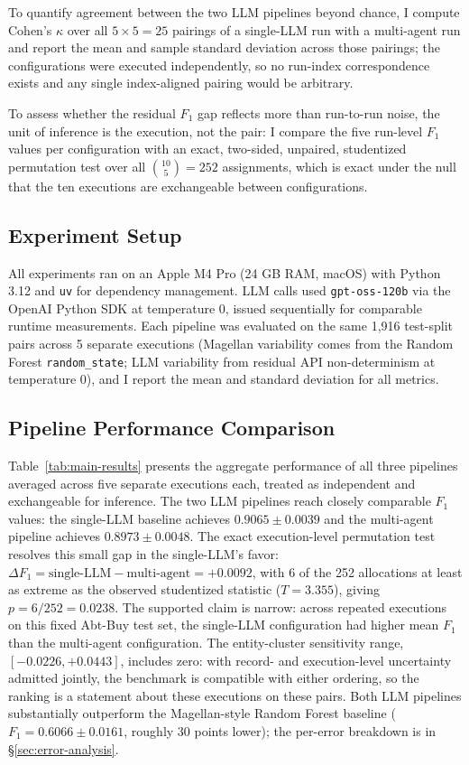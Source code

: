 \documentclass[sigconf]{acmart}
\begin{document}
To quantify agreement between the two LLM pipelines beyond chance,
I compute Cohen's $\kappa$ over all $5 \times 5 = 25$ pairings of a single-LLM run with a multi-agent run and report the mean and sample standard deviation across those pairings; the configurations were executed independently, so no run-index correspondence exists and any single index-aligned pairing would be arbitrary.

To assess whether the residual $F_1$ gap reflects more than run-to-run noise, the unit of inference is the execution, not the pair: I compare the five run-level $F_1$ values per configuration with an exact, two-sided, unpaired, studentized permutation test over all $\binom{10}{5} = 252$ assignments, which is exact under the null that the ten executions are exchangeable between configurations.

\subsection{Experiment Setup}
All experiments ran on an Apple M4 Pro (24 GB RAM, macOS) with Python 3.12 and \texttt{uv} for dependency management. LLM calls used \texttt{gpt-oss-120b} via the OpenAI Python SDK at temperature 0, issued sequentially for comparable runtime measurements. Each pipeline was evaluated on the same 1,916 test-split pairs across 5 separate executions (Magellan variability comes from the Random Forest \texttt{random\_state}; LLM variability from residual API non-determinism at temperature 0), and I report the mean and standard deviation for all metrics.

\subsection{Pipeline Performance Comparison}

Table~\ref{tab:main-results} presents the aggregate performance of all three pipelines averaged across five separate executions each, treated as independent and exchangeable for inference.
The two LLM pipelines reach closely comparable $F_1$ values: the single-LLM baseline achieves $0.9065 \pm 0.0039$ and the multi-agent pipeline achieves $0.8973 \pm 0.0048$.
The exact execution-level permutation test resolves this small gap in the single-LLM's favor: $\Delta F_1 = \text{single-LLM} - \text{multi-agent} = +0.0092$, with 6 of the 252 allocations at least as extreme as the observed studentized statistic ($T = 3.355$), giving $p = 6/252 = 0.0238$.
The supported claim is narrow: across repeated executions on this fixed Abt-Buy test set, the single-LLM configuration had higher mean $F_1$ than the multi-agent configuration.
The entity-cluster sensitivity range, $[-0.0226, +0.0443]$, includes zero: with record- and execution-level uncertainty admitted jointly, the benchmark is compatible with either ordering, so the ranking is a statement about these executions on these pairs.
Both LLM pipelines substantially outperform the Magellan-style Random Forest baseline ($F_1 = 0.6066 \pm 0.0161$, roughly 30 points lower); the per-error breakdown is in \S\ref{sec:error-analysis}.
\end{document}
